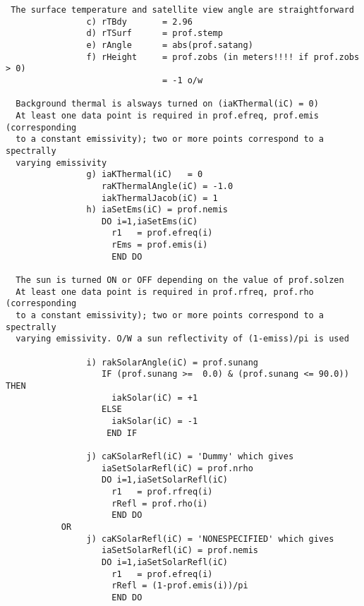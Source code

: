 \documentclass[12pt]{article}
\begin{document}
{\begin{verbatim}
 The surface temperature and satellite view angle are straightforward
                c) rTBdy       = 2.96 
                d) rTSurf      = prof.stemp  
                e) rAngle      = abs(prof.satang)  
                f) rHeight     = prof.zobs (in meters!!!! if prof.zobs > 0)
                               = -1 o/w

  Background thermal is alsways turned on (iaKThermal(iC) = 0)
  At least one data point is required in prof.efreq, prof.emis (corresponding
  to a constant emissivity); two or more points correspond to a spectrally
  varying emissivity
                g) iaKThermal(iC)   = 0  
                   raKThermalAngle(iC) = -1.0  
                   iakThermalJacob(iC) = 1  
                h) iaSetEms(iC) = prof.nemis  
                   DO i=1,iaSetEms(iC)   
                     r1   = prof.efreq(i)  
                     rEms = prof.emis(i)  
                     END DO 

  The sun is turned ON or OFF depending on the value of prof.solzen
  At least one data point is required in prof.rfreq, prof.rho (corresponding
  to a constant emissivity); two or more points correspond to a spectrally
  varying emissivity. O/W a sun reflectivity of (1-emiss)/pi is used

                i) rakSolarAngle(iC) = prof.sunang
                   IF (prof.sunang >=  0.0) & (prof.sunang <= 90.0)) THEN  
                     iakSolar(iC) = +1   
                   ELSE   
                     iakSolar(iC) = -1  
                    END IF  

                j) caKSolarRefl(iC) = 'Dummy' which gives  
                   iaSetSolarRefl(iC) = prof.nrho
                   DO i=1,iaSetSolarRefl(iC)   
                     r1   = prof.rfreq(i)  
                     rRefl = prof.rho(i)  
                     END DO 
           OR
                j) caKSolarRefl(iC) = 'NONESPECIFIED' which gives  
                   iaSetSolarRefl(iC) = prof.nemis
                   DO i=1,iaSetSolarRefl(iC)   
                     r1   = prof.efreq(i)  
                     rRefl = (1-prof.emis(i))/pi
                     END DO 
\end{verbatim}

}
\end{document}

